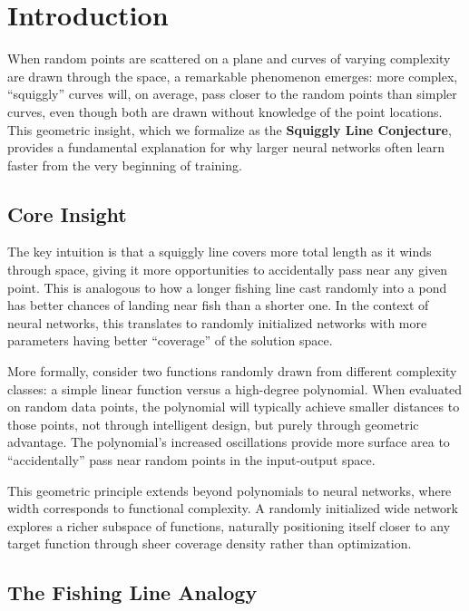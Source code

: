 \section{Introduction}
\label{sec:introduction}

When random points are scattered on a plane and curves of varying complexity are drawn through the space, a remarkable phenomenon emerges: more complex, ``squiggly'' curves will, on average, pass closer to the random points than simpler curves, even though both are drawn without knowledge of the point locations. This geometric insight, which we formalize as the \textbf{Squiggly Line Conjecture}, provides a fundamental explanation for why larger neural networks often learn faster from the very beginning of training.

\subsection{Core Insight}

The key intuition is that a squiggly line covers more total length as it winds through space, giving it more opportunities to accidentally pass near any given point. This is analogous to how a longer fishing line cast randomly into a pond has better chances of landing near fish than a shorter one. In the context of neural networks, this translates to randomly initialized networks with more parameters having better ``coverage'' of the solution space.

More formally, consider two functions randomly drawn from different complexity classes: a simple linear function versus a high-degree polynomial. When evaluated on random data points, the polynomial will typically achieve smaller distances to those points, not through intelligent design, but purely through geometric advantage. The polynomial's increased oscillations provide more surface area to ``accidentally'' pass near random points in the input-output space.

This geometric principle extends beyond polynomials to neural networks, where width corresponds to functional complexity. A randomly initialized wide network explores a richer subspace of functions, naturally positioning itself closer to any target function through sheer coverage density rather than optimization.

\subsection{The Fishing Line Analogy}

